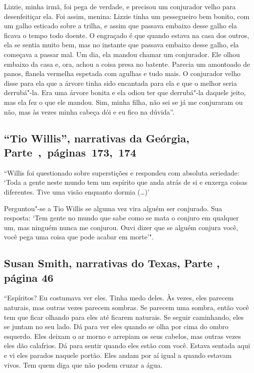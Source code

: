 Lizzie, minha irmã, foi pega de verdade, e precisou um conjurador velho
para desenfeitiçar ela. Foi assim, menina: Lizzie tinha um pessegueiro
bem bonito, com um galho esticado sobre a trilha, e assim que passava
embaixo desse galho ela ficava o tempo todo doente. O engraçado é que
quando estava na casa dos outros, ela se sentia muito bem, mas no
instante que passava embaixo desse galho, ela começava a passar mal. Um
dia, ela mandou chamar um conjurador. Ele olhou embaixo da casa e, ora,
achou a coisa presa no batente. Parecia um amontoado de panos, flanela
vermelha espetada com agulhas e tudo mais. O conjurador velho disse para
ela que a árvore tinha sido encantada para ela e que o melhor seria
derrubá"-la. Era uma árvore bonita e ela odiou ter que derrubá"-la daquele
jeito, mas ela fez o que ele mandou. Sim, minha filha, não sei se já me
conjuraram ou não, mas às vezes minha cabeça dói e eu fico na dúvida''.

\subsection{``Tio Willis'', narrativas da Geórgia, Parte~,~páginas~173,~174}

``Willis foi questionado sobre superstições e respondeu com absoluta
seriedade: `Toda a gente neste mundo tem um espírito que anda atrás de
si e enxerga coisas diferentes. Tive uma visão enquanto dormia
(\ldots{})'

Perguntou"-se a Tio Willis se alguma vez vira alguém ser conjurado. Sua
resposta: `Tem gente no mundo que sabe como se mata o conjuro em
qualquer um, mas ninguém nunca me conjurou. Ouvi dizer que se alguém
conjura você, você pega uma coisa que pode acabar em morte'".

\subsection{Susan Smith, narrativas do Texas, Parte , página 46}
\label{ref248} 

``Espíritos? Eu costumava ver eles. Tinha medo deles. Às vezes, eles
parecem naturais, mas outras vezes parecem sombras. Se parecem uma
sombra, então você tem que ficar olhando para eles até ficarem naturais.
Se seguir caminhando, eles se juntam no seu lado. Dá para ver eles
quando se olha por cima do ombro esquerdo. Eles deixam o ar morno e
arrepiam os seus cabelos, mas outras vezes eles dão calafrios. Dá para
sentir quando eles estão com você. Estava sentada aqui e vi eles parados
naquele portão. Eles andam por aí igual a quando estavam vivos. Tem quem
diga que não podem cruzar a água.

